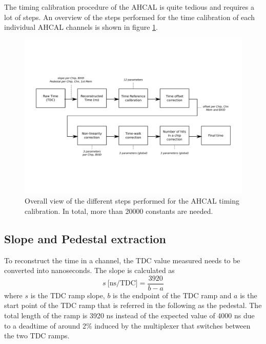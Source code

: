 \documentclass{JINST}
\begin{document}
The timing calibration procedure of the AHCAL is quite tedious and requires a lot of steps. An overview of the steps performed for the time calibration of each individual AHCAL channels is shown in figure \ref{fig:CalibOverview}.

\begin{figure}[htbp!]
	\centering
	\includegraphics[width=1\linewidth]{fig/TimeCalibOverview.pdf}
	\caption{Overall view of the different steps performed for the AHCAL timing calibration. In total, more than 20000 constants are needed.} \label{fig:CalibOverview}
\end{figure}

\subsection{Slope and Pedestal extraction}

To reconstruct the time in a channel, the TDC value measured needs to be converted into nanoseconds. The slope is calculated as
\begin{equation} \label{eq:slope}
	s \: \text{[ns/TDC]} = \frac{3920}{b - a}
\end{equation}
where $s$ is the TDC ramp slope, $b$ is the endpoint of the TDC ramp and $a$ is the start point of the TDC ramp that is referred in the following as the pedestal. The total length of the ramp is 3920 ns instead of the expected value of 4000 ns due to a deadtime of around 2\% \cite{Brianne2012} induced by the multiplexer that switches between the two TDC ramps.
\end{document}
